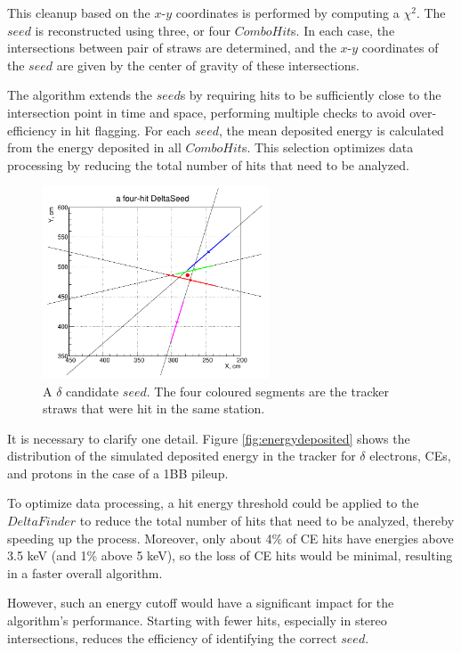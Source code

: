 This cleanup based on the $x$-$y$ coordinates is performed by computing a $\chi^2$. The $seed$ 
is reconstructed using three, or four $ComboHit$s. In each case, the intersections between pair of straws 
are determined, and the $x$-$y$ coordinates of the $seed$ are given 
by the center of gravity of these intersections. 

The algorithm extends the $seed$s by requiring 
hits to be sufficiently close to the intersection 
point in time and space, performing multiple checks 
to avoid over-efficiency in 
hit flagging. For each $seed$, 
the mean deposited energy is calculated from the energy 
deposited in all $ComboHit$s. 
This selection optimizes data processing by 
reducing the total number of hits that need to be analyzed.

\begin{figure}[!h]
    \centering
    \includegraphics[width =0.6\textwidth]{figures/png/Screenshot_20240811_115854.png}
    \caption[A $\delta$ candidate $seed$.]{A 
    $\delta$ candidate $seed$. The four 
    coloured segments are the tracker straws that were
    hit in the same station.}
    \label{fig:deltaseeds}
\end{figure}

It is necessary to clarify one detail. 
Figure \ref{fig:energydeposited} shows the 
distribution of the simulated deposited energy 
in the tracker for $\delta$ electrons, CEs, and 
protons in the case of a 1BB pileup. 

To optimize data processing, a hit energy 
threshold could be applied to the $DeltaFinder$ 
to reduce the total number of hits that 
need to be analyzed, thereby speeding up the process. Moreover, only about 
4\% of CE hits have energies above 3.5 keV 
(and 1\% above 5 keV), so the loss of CE 
hits would be minimal, resulting in a 
faster overall algorithm. 

However, such an energy cutoff would have a 
significant impact for the algorithm's performance. 
Starting with fewer hits, especially in 
stereo intersections, reduces the efficiency of identifying the correct $seed$. 

